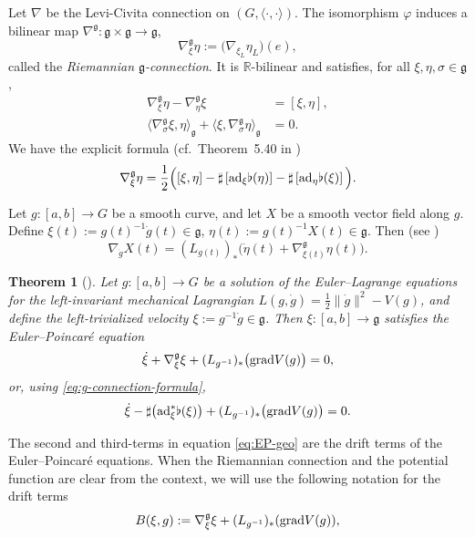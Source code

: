 \documentclass[letterpaper, 10 pt, conference]{ieeeconf}
\newtheorem{theorem}{Theorem}
\newcommand{\g}{\mathfrak{g}}
\newcommand{\grad}{\normalfont{\text{grad}}}
\newcommand{\ad}{\normalfont{\text{ad}}}
\begin{document}
Let $\nabla$ be the Levi-Civita connection on $(G,\langle\cdot,\cdot\rangle)$.
The isomorphism $\varphi$ induces a bilinear map $\nabla^\g:\g\times\g\to\g$,
\[
\nabla^\g_\xi\eta := \big(\nabla_{\xi_{L}}\eta_{L}\big)(e),
\]
called the \emph{Riemannian $\g$-connection}. It is $\mathbb{R}$-bilinear and satisfies, 
for all $\xi,\eta,\sigma\in\g$,
\begin{align}
    \nabla^\g_\xi\eta - \nabla^\g_\eta\xi &= [\xi,\eta], \label{eq:g-conn-torsion}\\
    \langle\nabla^\g_\sigma\xi,\eta\rangle_{\g}
    +\langle\xi,\nabla^\g_\sigma\eta\rangle_{\g} &= 0. \label{eq:g-conn-metric}
\end{align}
We have the explicit formula (cf.\ Theorem~5.40 in
\cite{bullo2019geometric})
\begin{equation}\label{eq:g-connection-formula}
    \nabla^\g_\xi\eta
    =\frac12\Big([\xi,\eta]
    -\sharp\left[\ad_\xi \flat(\eta)\right]
    -\sharp \left[\ad_\eta \flat(\xi)\right]\Big).
\end{equation}

Let $g:[a,b]\to G$ be a smooth curve, and let $X$ be a smooth vector field along $g$.
Define $\xi(t) := g(t)^{-1}\dot g(t)\in\g$, 
$\eta(t) := g(t)^{-1}X(t)\in\g$. Then (see  \cite{goodman2022reduction})
\begin{equation}\label{eq:cov-to-g-conn}
    \nabla_{\dot g}X(t)
    = (L_{g(t)})_\ast\big(\dot\eta(t)+\nabla^\g_{\xi(t)}\eta(t)\big).
\end{equation}

\begin{theorem}[\cite{goodman2022reduction}]
Let $g:[a,b]\to G$ be a solution of the Euler--Lagrange equations for the 
left-invariant mechanical Lagrangian $L(g,\dot g)=\tfrac12\|\dot g\|^2 - V(g)$, and define the left-trivialized velocity $\xi := g^{-1}\dot g \in \g$. Then $\xi:[a,b]\to\g$ satisfies the Euler--Poincar\'e equation 
\begin{equation}\label{eq:EP-geo}
    \dot\xi + \nabla^\g_\xi\xi 
    + (L_{g^{-1}})_{\ast}\big(\grad V(g)\big) = 0,
\end{equation}
or, using \eqref{eq:g-connection-formula},
\begin{equation}\label{eq:EP-geo-adstar}
    \dot\xi 
    - \sharp\big(\ad^\ast_\xi\flat(\xi)\big) 
    + (L_{g^{-1}})_{\ast}\big(\grad V(g)\big)
    = 0.
\end{equation}
\end{theorem}

The second and third-terms in equation \eqref{eq:EP-geo} are the 
drift terms of the Euler--Poincar\'e equations. When the Riemannian connection and the potential function are clear from the context, we will use the following notation for the drift terms
\[
B(\xi,g):=\nabla^{\g}_{\xi}\xi + (L_{g^{-1}})_\ast(\grad V(g)),
\]
\end{document}
